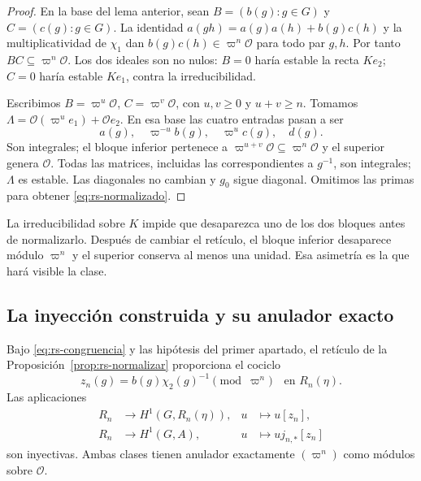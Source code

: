 \begin{proof}
En la base del lema anterior, sean $B=(b(g):g\in G)$ y
$C=(c(g):g\in G)$. La identidad
$a(gh)=a(g)a(h)+b(g)c(h)$ y la multiplicatividad de $\chi_1$
dan $b(g)c(h)\in\varpi^n\mathcal O$ para todo par $g,h$.
Por tanto $BC\subseteq\varpi^n\mathcal O$.
Los dos ideales son no nulos: $B=0$ haría estable la recta $Ke_2$;
$C=0$ haría estable $Ke_1$, contra la irreducibilidad.

Escribimos $B=\varpi^u\mathcal O$, $C=\varpi^v\mathcal O$,
con $u,v\ge0$ y $u+v\ge n$. Tomamos
$\Lambda=\mathcal O(\varpi^u e_1)+\mathcal O e_2$.
En esa base las cuatro entradas pasan a ser
\[
 a(g),\quad\varpi^{-u}b(g),\quad\varpi^u c(g),\quad d(g).
\]
Son integrales; el bloque inferior pertenece a
$\varpi^{u+v}\mathcal O\subseteq\varpi^n\mathcal O$ y el
superior genera $\mathcal O$. Todas las matrices, incluidas las
correspondientes a $g^{-1}$, son integrales; $\Lambda$ es estable.
Las diagonales no cambian y $g_0$ sigue diagonal. Omitimos las
primas para obtener \eqref{eq:rs-normalizado}.
\end{proof}

La irreducibilidad sobre $K$ impide que desaparezca uno de los dos
bloques antes de normalizarlo. Después de cambiar el retículo, el
bloque inferior desaparece módulo $\varpi^n$ y el superior conserva
al menos una unidad. Esa asimetría es la que hará visible la clase.

\subsection{La inyección construida y su anulador exacto}

\begin{teorema}
\label{thm:rs-inyeccion}
Bajo \eqref{eq:rs-congruencia} y las hipótesis del primer apartado,
el retículo de la Proposición~\ref{prop:rs-normalizar} proporciona
el cociclo
\begin{equation}
 z_n(g)=b(g)\chi_2(g)^{-1}\pmod{\varpi^n}
       \quad\text{en }R_n(\eta).
 \label{eq:rs-cociclo}
\end{equation}
Las aplicaciones
\begin{equation}
 \begin{aligned}
 R_n&\longrightarrow H^1(G,R_n(\eta)),& u&\longmapsto u[z_n],\\
 R_n&\longrightarrow H^1(G,A),& u&\longmapsto u j_{n,*}[z_n]
 \end{aligned}
 \label{eq:rs-inyecciones}
\end{equation}
son inyectivas. Ambas clases tienen anulador exactamente
$(\varpi^n)$ como módulos sobre $\mathcal O$.
\end{teorema}

